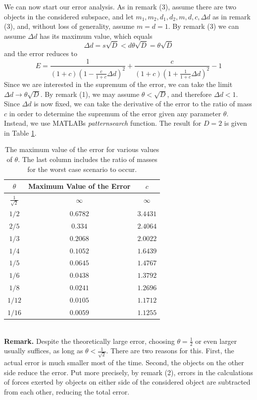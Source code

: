 We can now start our error analysis.
As in remark (3), assume there are two objects in the considered subspace, and let $m_1,m_2,d_1,d_2,m,d,c,\Delta d$ as in remark (3), and, without loss of generality, assume $m = d = 1$. By remark (3) we can assume $\Delta d$ has its maximum value, which equals
\[
\Delta d = s\sqrt{D} < d\theta \sqrt{D} = \theta\sqrt{D}
\]
and the error reduces to
\[
E = \frac{1}{(1+c)(1-\frac{c}{1+c}\Delta d)^2}+\frac{c}{(1+c)(1+\frac{1}{1+c}\Delta d)^2}-1
\]
Since we are interested in the supremum of the error, we can take the limit $\Delta d \rightarrow \theta \sqrt{D}$. By remark (1), we may assume $\theta < \sqrt{D}$, and therefore $\Delta d<1$.\\
Since $\Delta d$ is now fixed, we can take the derivative of the error to the ratio of mass $c$ in order to determine the supremum of the error given any parameter $\theta$. Instead, we use MATLABs \textit{patternsearch} function. The result for $D=2$ is given in Table \ref{tab:maxerror}.
\begin{table}[h!]
\centering
\caption{The maximum value of the error for various values of $\theta$. The last column includes the ratio of masses for the worst case scenario to occur.}
\label{tab:maxerror}
\begin{tabular}{c|c|c}
$\theta$ & Maximum Value of the Error & $c$\\
\hline
$\frac{1}{\sqrt{2}}$ & $\infty$ & $\infty$\\
$1/2$ & $0.6782$ & $3.4431$\\
$2/5$ & $0.334$ & $2.4064$\\
$1/3$ & $0.2068$ & $2.0022$\\
$1/4$ & $0.1052$ & $1.6439$\\
$1/5$ & $0.0645$ & $1.4767$\\
$1/6$ & $0.0438$ & $1.3792$\\
$1/8$ & $0.0241$ & $1.2696$\\
$1/12$ & $0.0105$ & $1.1712$\\
$1/16$ & $0.0059$ & $1.1255$ 
\end{tabular}
\end{table}\\
\textbf{Remark.} Despite the theoretically large error, choosing $\theta = \frac{1}{2}$ or even larger usually suffices, as long as $\theta < \frac{1}{\sqrt{2}}$. There are two reasons for this. First, the actual error is much smaller most of the time. Second, the objects on the other side reduce the error. Put more precisely, by remark (2), errors in the calculations of forces exerted by objects on either side of the considered object are subtracted from each other, reducing the total error.
